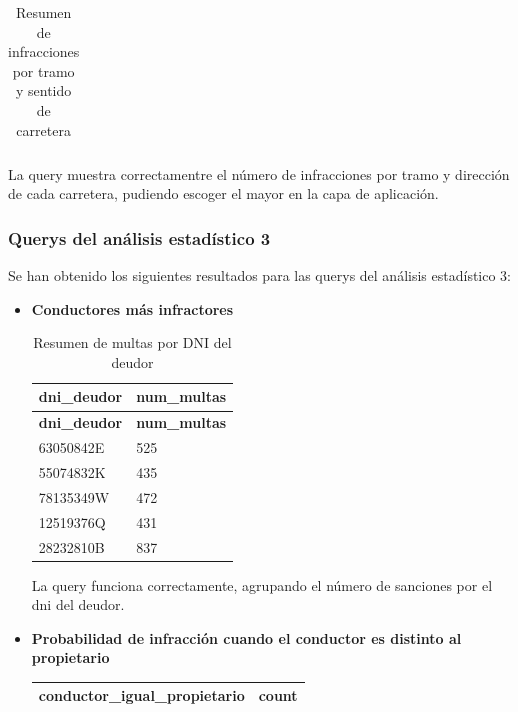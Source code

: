 \documentclass[]{article}
\begin{document}
\begin{itemize}
\begin{table}[H]
\begin{longtable}{l l l l}
\end{longtable}
\caption{Resumen de infracciones por tramo y sentido de carretera}
\end{table}

La query muestra correctamentre el número de infracciones por tramo y dirección de cada carretera, pudiendo escoger el mayor en la capa de aplicación.

\end{itemize}

\subsubsection{Querys del análisis estadístico 3}
Se han obtenido los siguientes resultados para las querys del análisis estadístico 3:

\begin{itemize}
    \item \textbf{Conductores más infractores}

\begin{table}[H]
\begin{longtable}{l l}
    \hline
    \textbf{dni\_deudor} & \textbf{num\_multas} \\ \hline
    \endfirsthead
    
    \hline
    \textbf{dni\_deudor} & \textbf{num\_multas} \\ \hline
    \endhead
    
    63050842E & 525 \\ \hline
    55074832K & 435 \\ \hline
    78135349W & 472 \\ \hline
    12519376Q & 431 \\ \hline
    28232810B & 837 \\ \hline
    
\end{longtable}
\caption{Resumen de multas por DNI del deudor}
\end{table}

La query funciona correctamente, agrupando el número de sanciones por el dni del deudor.

    \item \textbf{Probabilidad de infracción cuando el conductor es distinto al propietario}

\begin{table}[H]
\begin{longtable}{l l}
    \hline
    \textbf{conductor\_igual\_propietario} & \textbf{count} \\ \hline
    \endfirsthead
    

\end{longtable}
\end{table}
\end{itemize}
\end{document}
